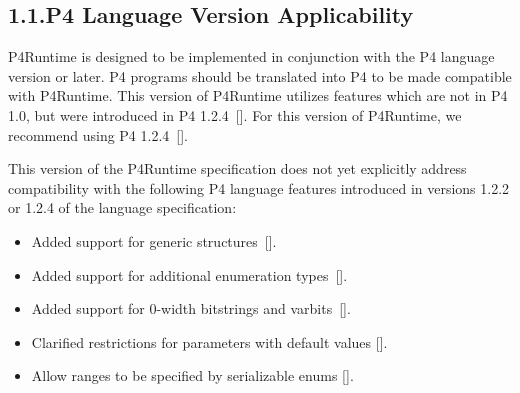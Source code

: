 \documentclass[11pt]{article}
\begin{document}
{%
\subsection{1.1.\hspace*{0.5em}P4 Language Version Applicability}\label{sec-p4-language-version-applicability}%

\noindent{}P4Runtime is designed to be implemented in conjunction with the P4 language
version or later. P4 programs should be translated into P4 to be made
compatible with P4Runtime. This version of P4Runtime utilizes features which are
not in P4 1.0, but were introduced in P4 1.2.4~[]. For
this version of P4Runtime, we recommend using P4 1.2.4~[].%

This version of the P4Runtime specification does not yet explicitly
address compatibility with the following P4 language features
introduced in versions 1.2.2 or 1.2.4 of the language specification:%

\begin{itemize}[noitemsep,topsep=\mdcompacttopsep]%

\item{}Added support for generic structures~[].%

\item{}Added support for additional enumeration types~[].%

\item{}Added support for 0-width bitstrings and varbits~[].%

\item{}Clarified restrictions for parameters with default values
[].%

\item{}Allow ranges to be specified by serializable enums
[].%


\end{itemize}}
\end{document}
